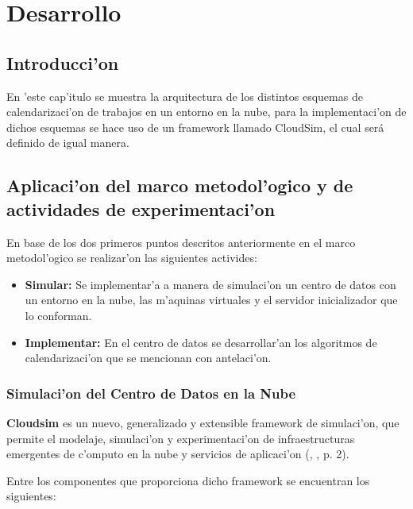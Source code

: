 \chapter{Desarrollo}
\section*{Introducci'on}

En 'este cap'itulo se muestra la arquitectura de los distintos esquemas de calendarizaci'on de trabajos en un entorno en la nube, para la implementaci'on de dichos esquemas se hace uso de un framework llamado CloudSim, el cual será definido de igual manera.


\newpage


\section{Aplicaci'on del marco metodol'ogico y de actividades de experimentaci'on}

En base de los dos primeros puntos descritos anteriormente en el marco metodol'ogico se realizar'on las siguientes activides:

\begin{itemize}
	\item \textbf{Simular:} Se implementar'a a manera de simulaci'on un centro de datos con un entorno en la nube, las m'aquinas virtuales y el servidor inicializador que lo conforman.
	\item \textbf{Implementar:} En el centro de datos se desarrollar'an los algoritmos de calendarizaci'on que se mencionan con antelaci'on.
\end{itemize}

\subsection{Simulaci'on del Centro de Datos en la Nube}

 \textbf{Cloudsim} es un nuevo, generalizado y extensible framework de simulaci'on, que permite el modelaje, simulaci'on y experimentaci'on de infraestructuras emergentes de c'omputo en la nube y servicios de aplicaci'on (\citeauthor{calheiros2011cloudsim}, \citeyear{calheiros2011cloudsim}, p. 2).

Entre los componentes que proporciona dicho framework se encuentran los siguientes:

